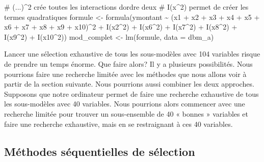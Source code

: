 \documentclass[
  11pt,
  letterpaper,
]{scrbook}
\newenvironment{Shaded}{\begin{snugshade}}{\end{snugshade}}
\newcommand{\AttributeTok}[1]{\textcolor[rgb]{0.40,0.45,0.13}{#1}}
\newcommand{\CommentTok}[1]{\textcolor[rgb]{0.37,0.37,0.37}{#1}}
\newcommand{\DecValTok}[1]{\textcolor[rgb]{0.68,0.00,0.00}{#1}}
\newcommand{\FunctionTok}[1]{\textcolor[rgb]{0.28,0.35,0.67}{#1}}
\newcommand{\NormalTok}[1]{\textcolor[rgb]{0.00,0.23,0.31}{#1}}
\newcommand{\OtherTok}[1]{\textcolor[rgb]{0.00,0.23,0.31}{#1}}
\newcommand{\SpecialCharTok}[1]{\textcolor[rgb]{0.37,0.37,0.37}{#1}}
\theoremstyle{definition}
\theoremstyle{remark}
\begin{document}
\begin{Shaded}
\begin{Highlighting}[]
\CommentTok{\# (...)\^{}2 crée toutes les interactions d\textquotesingle{}ordre deux}
\CommentTok{\# I(x\^{}2) permet de créer les termes quadratiques}
\NormalTok{formule }\OtherTok{\textless{}{-}} 
  \FunctionTok{formula}\NormalTok{(ymontant }\SpecialCharTok{\textasciitilde{}} 
\NormalTok{          (x1 }\SpecialCharTok{+}\NormalTok{ x2 }\SpecialCharTok{+}\NormalTok{ x3 }\SpecialCharTok{+}\NormalTok{ x4 }\SpecialCharTok{+}\NormalTok{ x5 }\SpecialCharTok{+} 
\NormalTok{             x6 }\SpecialCharTok{+}\NormalTok{ x7 }\SpecialCharTok{+}\NormalTok{ x8 }\SpecialCharTok{+}\NormalTok{ x9 }\SpecialCharTok{+}\NormalTok{ x10)}\SpecialCharTok{\^{}}\DecValTok{2} \SpecialCharTok{+} 
            \FunctionTok{I}\NormalTok{(x2}\SpecialCharTok{\^{}}\DecValTok{2}\NormalTok{) }\SpecialCharTok{+} \FunctionTok{I}\NormalTok{(x6}\SpecialCharTok{\^{}}\DecValTok{2}\NormalTok{) }\SpecialCharTok{+} \FunctionTok{I}\NormalTok{(x7}\SpecialCharTok{\^{}}\DecValTok{2}\NormalTok{) }\SpecialCharTok{+}
            \FunctionTok{I}\NormalTok{(x8}\SpecialCharTok{\^{}}\DecValTok{2}\NormalTok{) }\SpecialCharTok{+} \FunctionTok{I}\NormalTok{(x9}\SpecialCharTok{\^{}}\DecValTok{2}\NormalTok{) }\SpecialCharTok{+} \FunctionTok{I}\NormalTok{(x10}\SpecialCharTok{\^{}}\DecValTok{2}\NormalTok{))}
\NormalTok{mod\_complet }\OtherTok{\textless{}{-}} \FunctionTok{lm}\NormalTok{(formule, }\AttributeTok{data =}\NormalTok{ dbm\_a)}
\end{Highlighting}
\end{Shaded}

Lancer une sélection exhaustive de tous les sous-modèles avec 104
variables risque de prendre un temps énorme. Que faire alors? Il y a
plusieurs possibilités. Nous pourrions faire une recherche limitée avec
les méthodes que nous allons voir à partir de la section suivante. Nous
pourrions aussi combiner les deux approches. Supposons que notre
ordinateur permet de faire une recherche exhaustive de tous les
sous-modèles avec 40 variables. Nous pourrions alors commencer avec une
recherche limitée pour trouver un sous-ensemble de 40 « bonnes »
variables et faire une recherche exhaustive, mais en se restraignant à
ces 40 variables.

\subsection{Méthodes séquentielles de
sélection}\label{muxe9thodes-suxe9quentielles-de-suxe9lection}
\end{document}
